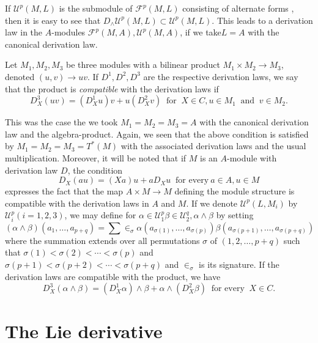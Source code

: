 If $\mathscr{U}^p ( M,L)$ is the submodule of $\mathscr{F}^p(M,L)$
consisting of alternate forms , then it is easy to see that $D_\wedge
\mathscr{U}^p (M,L) \subset \mathscr{U}^p (M,L)$. This leads to a
derivation law in the $A$-modules $\mathscr{F}^p(M,A), \mathscr{U}^p
(M,A)$, if we take\pageoriginale $L=A$ with the canonical derivation law. 

Let $M_1, M_2, M_3$ be three modules with a bilinear product $M_1
\times M_2 \to  M_3$, denoted $(u,v) \to uv$. If $D^1, D^2, D^3$ are
the respective derivation  laws, we say that the product is
\textit{compatible} with the derivation laws if  
$$
D^3_X(uv) = (D^1_Xu) v +  u(D^2_X v) ~ \text{ for } ~ X \in C, u \in
M_1 ~ \text{ and } ~ v \in M_2. 
$$

This was the case the we took $M_1 =M_2= M_3 =A$ with the canonical
derivation law and the algebra-product. Again, we seen that the above
condition is satisfied by $M_1 = M_2= M_3 = T^*(M)$ with the
associated derivation laws and the usual multiplication. Moreover, it
will be noted that if $M$ is an $A$-module with derivation law  $D$,
the condition 
$$
D_X(au) = (Xa) u+  a D_X u ~ \text{ for every} ~ a \in A ,u \in M
$$
expresses the fact that the map $A \times M \to  M$ defining the
module structure is compatible with the derivation laws in $A$ and
$M$. If we denote $\mathscr{U}^p(L,M_i)$ by $\mathscr{U}^p_i
(i=1,2,3)$, we may define for $\alpha \in \mathscr{U}^p_1 \beta \in
\mathscr{U}^q_2 , \alpha  \wedge  \beta$ by setting 
$$
(\alpha \wedge \beta) (a_1, \ldots ,a_{p+q}) = \sum \in_\sigma \alpha
(a_{\sigma (1)}, \ldots , a_{\sigma(p)}) \beta(a_{\sigma (p+1)},
\ldots , a_{\sigma(p+q)}) 
$$
where the summation extends over all permutations $\sigma$ of $(1,2 ,
\ldots  , p+q)$ such that $\sigma(1) <  \sigma (2) <\cdots <
\sigma(p)$ and $\sigma(p+1) < \sigma(p+2) < \cdots < \sigma (p+q)$ and
$\in_\sigma$ is its signature. If the derivation laws are compatible
with the product, we have  
$$
D^3_X(\alpha \wedge \beta) = (D^1_X \alpha) \wedge \beta + \alpha
\wedge(D^2_X \beta) ~ \text{ for every } ~ X \in C.  
$$

\section{The Lie derivative}\label{chap1:sec4} %

